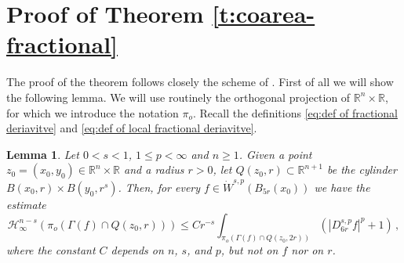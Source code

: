 \documentclass[11pt,reqno]{amsart}
\renewcommand{\H}{\mathcal{H}}
\newtheorem{lemma}[theorem]{Lemma}
\theoremstyle{definition}
\numberwithin{equation}{section}
\begin{document}
\section{Proof of Theorem \ref{t:coarea-fractional}}

The proof of the theorem follows closely the scheme of \cite{MSZ03}. First of all we will show the following lemma. We will use routinely the orthogonal projection of $\mathbb R^n \times \mathbb R$, for which we introduce the notation $\pi_o$. Recall the definitions \eqref{eq:def of fractional deriavitve} and \eqref{eq:def of local fractional deriavitve}.

\begin{lemma}\label{l:cylinder-estimate}
Let $0<s<1$, $1\leq p < \infty$ and $n\geq 1$. Given a point $z_0 = (x_0, y_0) \in \mathbb R^n\times \mathbb R$ and a radius $r>0$, let $Q(z_0,r)\subset \mathbb R^{n+1}$ be the cylinder $B(x_0,r)\times B(y_0,r^s)$. 
Then, for every $f\in \dot{W}^{s,p} (B_{5r} (x_0))$ we have the estimate
\[
\H^{n-s}_{\infty}(\pi_o (\Gamma (f)\cap Q(z_0,r)))\le Cr^{-s}\int_{\pi_o (\Gamma (f) \cap Q(z_0,2r))} (|D^{s,p}_{6r} f|^p+1)\, ,
\]
where the constant $C$ depends on $n$, $s$, and $p$, but not on $f$ nor on $r$.
\end{lemma}
\end{document}
